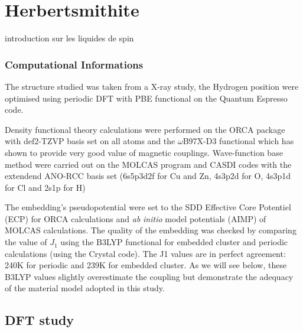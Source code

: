 \documentclass[10pt]{report}
\numberwithin{equation}{section}
\begin{document}
\chapter{Herbertsmithite}

introduction sur les liquides de spin

\subsection*{Computational Informations}

The structure studied was taken from a X-ray study, the Hydrogen position were optimised using periodic DFT with PBE functional on the Quantum Espresso code.

Density functional theory calculations were performed on the ORCA package with def2-TZVP basis set on all atoms and the $\omega$B97X-D3 functional which has shown to provide very good value of magnetic couplings.
Wave-function base method were carried out on the MOLCAS program and CASDI codes with the extendend ANO-RCC basis set (6s5p3d2f for Cu and Zn, 4s3p2d
for O, 4s3p1d for Cl and 2s1p for H)

The embedding's pseudopotential were set to the SDD Effective Core Potentiel (ECP) for ORCA calculations and \textit{ab} \textit{initio} model potentials (AIMP) of MOLCAS calculations. 
The quality of the embedding was checked by comparing the value of $J_1$ using the B3LYP functional for embedded cluster and periodic calculations (using the Crystal code). 
The J1 values are in perfect agreement: 240K for periodic and 239K for embedded cluster. 
As we will see below, these B3LYP values slightly overestimate the coupling but demonstrate the adequacy of the material model adopted in this study.

\section{DFT study}
\end{document}
